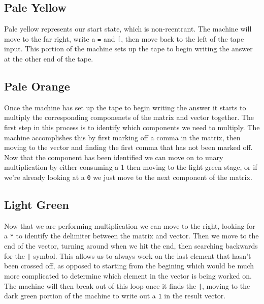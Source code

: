 \documentclass[letterpaper, 11pt]{article}
\begin{document}
\subsection{Pale Yellow}
\label{sec:orgb4eb239}
Pale yellow represents our start state, which is non-reentrant. The machine will move to the far right, write a \texttt{=} and \texttt{[}, then move back to the left of the tape input. This portion of the machine sets up the tape to begin writing the answer at the other end of the tape.\\
\subsection{Pale Orange}
\label{sec:org757ab1c}
Once the machine has set up the tape to begin writing the answer it starts to multiply the corresponding componenets of the matrix and vector together. The first step in this process is to identify which components we need to multiply. The machine accomplishes this by first marking off a comma in the matrix, then moving to the vector and finding the first comma that has not been marked off. Now that the component has been identified we can move on to unary multiplication by either consuming a 1 then moving to the light green stage, or if we're already looking at a \texttt{0} we just move to the next component of the matrix.\\
\subsection{Light Green}
\label{sec:orgd4e0b83}
Now that we are performing multiplication we can move to the right, looking for a \texttt{*} to identify the delimiter between the matrix and vector. Then we move to the end of the vector, turning around when we hit the end, then searching backwards for the \texttt{|} symbol. This allows us to always work on the last element that hasn't been crossed off, as opposed to starting from the begining which would be much more complicated to determine which element in the vector is being worked on. The machine will then break out of this loop once it finds the \texttt{|}, moving to the dark green portion of the machine to write out a \texttt{1} in the result vector.\\
\end{document}
